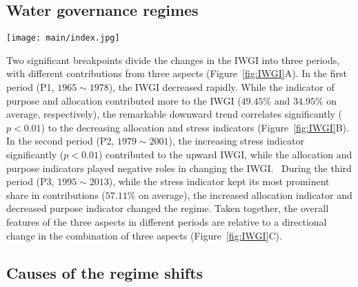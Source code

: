 \subsection{Water governance regimes}\label{Res.1}

\begin{figure*}[ht!]
	\centering
	\texttt{[image: main/index.jpg]}
	\caption{Changes in the IWGI index and corresponding water governance regimes: P1: $1965 \sim 1978$, P2: $1979 \sim 2001$, and P3: $2002 \sim 2013$.
	\textbf{A,} detecting change points of IWGI and contributions from each indicator. Two significant change points ($p<0.01$) occurred in 1978 and 2001.
	\textbf{B,} correlation of trends between the IWGI and the indicators.
	\textbf{C,} across three indicators, changing components of the IWGI, whose directions shifts between different regimes.
	}\label{fig:IWGI}
\end{figure*}

Two significant breakpoints divide the changes in the IWGI into three periods, with different contributions from three aspects (Figure~\ref{fig:IWGI}A).
In the first period (P1, $1965 \sim 1978$), the IWGI decreased rapidly.
While the indicator of purpose and allocation contributed more to the IWGI ($49.45\%$ and $34.95\%$ on average, respectively), the remarkable downward trend correlates significantly ($p<0.01$) to the decreasing allocation and stress indicators (Figure~\ref{fig:IWGI}B).
In the second period (P2, $1979 \sim 2001$), the increasing stress indicator significantly ($p<0.01$) contributed to the upward IWGI, while the allocation and purpose indicators played negative roles in changing the IWGI.\
During the third period (P3, $1995 \sim 2013$), while the stress indicator kept its most prominent share in contributions ($57.11\%$ on average), the increased allocation indicator and decreased purpose indicator changed the regime.
Taken together, the overall features of the three aspects in different periods are relative to a directional change in the combination of three aspects (Figure~\ref{fig:IWGI}C).

\subsection{Causes of the regime shifts}\label{Res.2}


